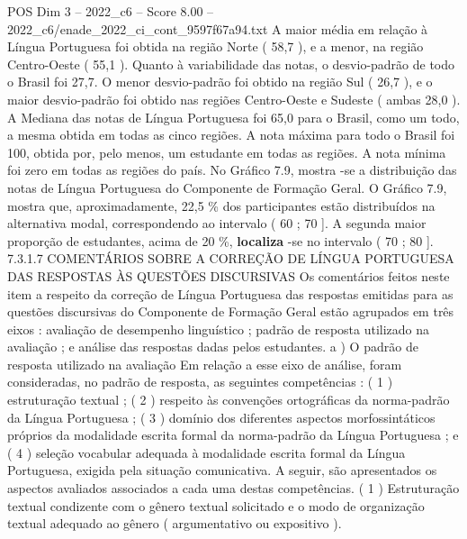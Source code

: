 \begin{textsample}{POS Dim 3 – 2022\_c6 – Score 8.00 – 2022\_c6/enade\_2022\_ci\_cont\_9597f67a94.txt}
A maior média em relação à Língua Portuguesa foi obtida na região Norte ( 58,7 ), e a menor, na região Centro-Oeste ( 55,1 ).
Quanto à variabilidade das notas, o desvio-padrão de todo o Brasil foi 27,7.
O menor desvio-padrão foi obtido na região Sul ( 26,7 ), e o maior desvio-padrão foi obtido nas regiões Centro-Oeste e Sudeste ( ambas 28,0 ).
A Mediana das notas de Língua Portuguesa foi 65,0 para o Brasil, como um todo, a mesma obtida em todas as cinco regiões.
A nota máxima para todo o Brasil foi 100, obtida por, pelo menos, um estudante em todas as regiões.
A nota mínima foi zero em todas as regiões do país.
No Gráfico 7.9, mostra -se a distribuição das notas de Língua Portuguesa do Componente de Formação Geral.
O Gráfico 7.9, mostra que, aproximadamente, 22,5 \% dos participantes estão distribuídos na alternativa modal, correspondendo ao intervalo ( 60 ; 70 ].
A segunda maior proporção de estudantes, acima de 20 \%, \textbf{localiza} -se no intervalo ( 70 ; 80 ]. 7.3.1.7 COMENTÁRIOS SOBRE A CORREÇÃO DE LÍNGUA PORTUGUESA DAS RESPOSTAS ÀS QUESTÕES DISCURSIVAS Os comentários feitos neste item a respeito da correção de Língua Portuguesa das respostas emitidas para as questões discursivas do Componente de Formação Geral estão agrupados em três eixos : avaliação de desempenho linguístico ; padrão de resposta utilizado na avaliação ; e análise das respostas dadas pelos estudantes. a ) O padrão de resposta utilizado na avaliação Em relação a esse eixo de análise, foram consideradas, no padrão de resposta, as seguintes competências : ( 1 ) estruturação textual ; ( 2 ) respeito às convenções ortográficas da norma-padrão da Língua Portuguesa ; ( 3 ) domínio dos diferentes aspectos morfossintáticos próprios da modalidade escrita formal da norma-padrão da Língua Portuguesa ; e ( 4 ) seleção vocabular adequada à modalidade escrita formal da Língua Portuguesa, exigida pela situação comunicativa.
A seguir, são apresentados os aspectos avaliados associados a cada uma destas competências. ( 1 ) Estruturação textual condizente com o gênero textual solicitado e o modo de organização textual adequado ao gênero ( argumentativo ou expositivo ).

\end{textsample}
